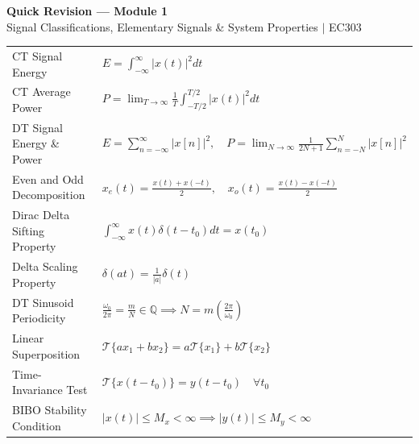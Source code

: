 \documentclass[12pt,a4paper]{article}
\renewcommand{\arraystretch}{1.45}
\begin{document}
\newpage

\begin{center}
  {\large\bfseries\color{myred} Quick Revision --- Module 1}\\[3pt]
  {\small\color{mydark} Signal Classifications, Elementary Signals \& System Properties $|$ EC303}
\end{center}
\noindent{\color{myred}\rule{\linewidth}{1.2pt}}
\vspace{4pt}

\begin{tcolorbox}[formulabox, title={\textbf{Key Formulas and Conditions at a Glance}}]
\renewcommand{\arraystretch}{1.35}
\begin{tabularx}{\linewidth}{B{5.0cm} X}
CT Signal Energy & $E = \int_{-\infty}^{\infty} |x(t)|^2 dt$ \\[4pt]
CT Average Power & $P = \lim_{T \to \infty} \frac{1}{T} \int_{-T/2}^{T/2} |x(t)|^2 dt$ \\[4pt]
DT Signal Energy \& Power & $E = \sum_{n=-\infty}^{\infty} |x[n]|^2, \quad P = \lim_{N \to \infty} \frac{1}{2N+1} \sum_{n=-N}^N |x[n]|^2$ \\[4pt]
Even and Odd Decomposition & $x_e(t) = \frac{x(t) + x(-t)}{2}, \quad x_o(t) = \frac{x(t) - x(-t)}{2}$ \\[4pt]
Dirac Delta Sifting Property & $\int_{-\infty}^{\infty} x(t) \delta(t - t_0) dt = x(t_0)$ \\[4pt]
Delta Scaling Property & $\delta(at) = \frac{1}{|a|} \delta(t)$ \\[4pt]
DT Sinusoid Periodicity & $\frac{\omega_0}{2\pi} = \frac{m}{N} \in \mathbb{Q} \implies N = m\left(\frac{2\pi}{\omega_0}\right)$ \\[4pt]
Linear Superposition & $\mathcal{T}\{a x_1 + b x_2\} = a \mathcal{T}\{x_1\} + b \mathcal{T}\{x_2\}$ \\[4pt]
Time-Invariance Test & $\mathcal{T}\{x(t - t_0)\} = y(t - t_0) \quad \forall t_0$ \\[4pt]
BIBO Stability Condition & $|x(t)| \le M_x < \infty \implies |y(t)| \le M_y < \infty$ \\[4pt]
\end{tabularx}
\end{tcolorbox}
\end{document}
